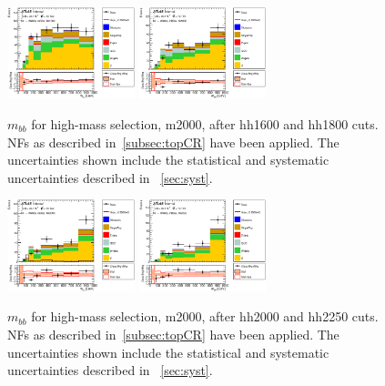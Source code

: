 \begin{figure}[!h]
\begin{center}
\includegraphics*[width=0.33\textwidth] {figures/ControlPlots/reOpt2000_bbMass_allMhh/C_reOpt2000_bbpt350_wwpt250_drww15_hh1600_bbMass_regionA_met25d020}
\includegraphics*[width=0.33\textwidth] {figures/ControlPlots/reOpt2000_bbMass_allMhh/C_reOpt2000_bbpt350_wwpt250_drww15_hh1800_bbMass_regionA_met25d020}
\caption[$m_{bb}$ for low-mass selection, m2000, after hh1600 and hh1800 cuts.]{$m_{bb}$ for high-mass selection, m2000, after hh1600 and hh1800 cuts. \ttbar NFs as described in~\ref{subsec:topCR} have been applied. The uncertainties shown include the statistical and systematic uncertainties described in ~\ref{sec:syst}.}
\end{center}
\end{figure}


\begin{figure}[!h]
\begin{center}
\includegraphics*[width=0.33\textwidth] {figures/ControlPlots/reOpt2000_bbMass_allMhh/C_reOpt2000_bbpt350_wwpt250_drww15_hh2000_bbMass_regionA_met25d020}
\includegraphics*[width=0.33\textwidth] {figures/ControlPlots/reOpt2000_bbMass_allMhh/C_reOpt2000_bbpt350_wwpt250_drww15_hh2250_bbMass_regionA_met25d020}
\caption[$m_{bb}$ for low-mass selection, m2000, after hh2000 and hh2250 cuts.]{$m_{bb}$ for high-mass selection, m2000, after hh2000 and hh2250 cuts. \ttbar NFs as described in~\ref{subsec:topCR} have been applied. The uncertainties shown include the statistical and systematic uncertainties described in ~\ref{sec:syst}.}
\end{center}
\end{figure}

